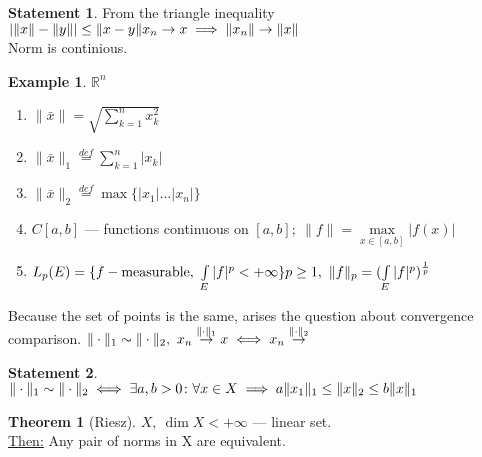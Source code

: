 \documentclass[12pt, fleqn]{article}
\theoremstyle{definition}
\newtheorem{ex}{Example}
\theoremstyle{break}
\newtheorem{thm}{Theorem}[section]
\theoremstyle{theorem}
\newtheorem{stm}{Statement}[section]
\newcommand{\defeq}{\overset{def}{=}}
\begin{document}
\begin{stm}
  From the triangle inequality $|\|x\| - \|y\|| \leq \|x - y\|
  \\x_n \to x \implies \|x_n\| \to \|x\|$
  \\Norm is continious.
\end{stm}
\begin{ex}
  $\mathbb{R}^n$ 
  \begin{enumerate}
  \item $\|\bar{x}\| = \sqrt{\sum\limits_{k = 1}^n x_k^2}$
  \item $\|\bar{x}\|_1 \defeq \sum\limits_{k = 1}^n|x_k|$
  \item $\|\bar{x}\|_2 \defeq \max \{|x_1| \dotso |x_n|\}$
  \item $C[a, b]$ --- functions continuous on $[a, b];\ \|f\| = \max\limits_{x \in [a, b]}|f(x)|$ 
  \item $L_p (E) = \{f - \textnormal{measurable},\ \int\limits_E |f|^p < +
    \infty\}\\p \geq 1,\ \|f\|_p = (\int\limits_E |f|^p)^{\frac 1p}$
  \end{enumerate}
\end{ex}
Because the set of points is the same, arises the question about convergence
comparison.
$\\\|\cdot\|_1 \sim \|\cdot\|_2,\ x_n \overset{\|\cdot\|_1}{\to} x \iff x_n \overset{\|\cdot\|_2}{\to}$
\begin{stm}
  $\\\|\cdot\|_1 \sim \|\cdot\|_2 \iff \exists a, b > 0\colon \forall x \in X
  \implies a\|x_1\|_1 \leq \|x\|_2 \leq b \|x\|_1$
\end{stm}
\begin{thm}[Riesz]
  $X,\ \dim{X} < +\infty$ --- linear set.
  \\\underline{Then:} Any pair of norms in X are equivalent.
\end{thm}
\end{document}
